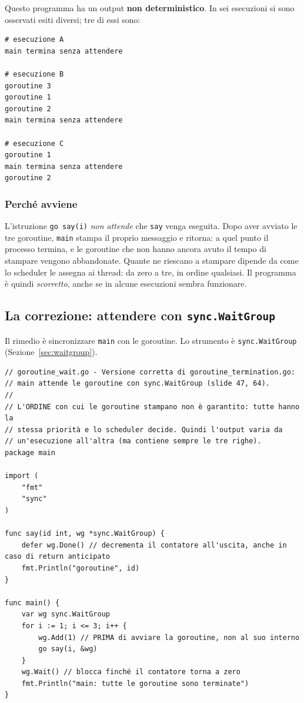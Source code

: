 \documentclass[11pt,a4paper]{report}
\newcommand{\cod}[1]{\texttt{#1}}
\begin{document}
Questo programma ha un output \textbf{non deterministico}. In sei esecuzioni
si sono osservati esiti diversi; tre di essi sono:

\begin{lstlisting}[style=output]
# esecuzione A
main termina senza attendere

# esecuzione B
goroutine 3
goroutine 1
goroutine 2
main termina senza attendere

# esecuzione C
goroutine 1
main termina senza attendere
goroutine 2
\end{lstlisting}

\subsubsection*{Perché avviene}

L'istruzione \cod{go say(i)} \emph{non attende} che \cod{say} venga eseguita. Dopo
aver avviato le tre goroutine, \cod{main} stampa il proprio messaggio e ritorna: a
quel punto il processo termina, e le goroutine che non hanno ancora avuto
il tempo di stampare vengono abbandonate. Quante ne riescano a stampare
dipende da come lo scheduler le assegna ai thread: da zero a tre, in ordine
qualsiasi. Il programma è quindi \emph{scorretto}, anche se in alcune
esecuzioni sembra funzionare.

\subsection{La correzione: attendere con \texttt{sync.WaitGroup}}

Il rimedio è sincronizzare \cod{main} con le goroutine. Lo strumento è
\cod{sync.WaitGroup} (Sezione~\ref{sec:waitgroup}).

\begin{lstlisting}[style=gocode,caption={\texttt{06\_concurrency/goroutine\_wait.go}}]
// goroutine_wait.go - Versione corretta di goroutine_termination.go:
// main attende le goroutine con sync.WaitGroup (slide 47, 64).
//
// L'ORDINE con cui le goroutine stampano non è garantito: tutte hanno la
// stessa priorità e lo scheduler decide. Quindi l'output varia da
// un'esecuzione all'altra (ma contiene sempre le tre righe).
package main

import (
	"fmt"
	"sync"
)

func say(id int, wg *sync.WaitGroup) {
	defer wg.Done() // decrementa il contatore all'uscita, anche in caso di return anticipato
	fmt.Println("goroutine", id)
}

func main() {
	var wg sync.WaitGroup
	for i := 1; i <= 3; i++ {
		wg.Add(1) // PRIMA di avviare la goroutine, non al suo interno
		go say(i, &wg)
	}
	wg.Wait() // blocca finché il contatore torna a zero
	fmt.Println("main: tutte le goroutine sono terminate")
}
\end{lstlisting}
\end{document}
